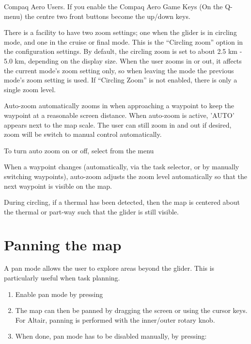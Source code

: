 Compaq Aero Users. If you enable the Compaq Aero Game Keys (On the
Q-menu) the centre two front buttons become the up/down keys.

There is a facility to have two zoom settings; one when the glider is
in circling mode, and one in the cruise or final mode.  This is the ``Circling
zoom'' option in the  configuration settings.  
By default, the circling zoom is set to about 2.5 km - 5.0 km, depending on the
display size. When the user zooms in or out, it affects the current
mode's zoom setting only, so when leaving the mode the previous mode's
zoom setting is used.  If ``Circling Zoom'' is not enabled,
there is only a single zoom level.

Auto-zoom automatically zooms in when approaching a waypoint to keep
the waypoint at a reasonable screen distance. When auto-zoom is active,
'AUTO' appears next to the map scale. The user can still zoom
in and out if desired, zoom will be switch to manual control automatically.

To turn auto zoom on or off, select from the menu
\begin{quote}
\blink{}\blink{} 
\end{quote}

When a waypoint changes (automatically, via the task selector, or by
manually switching waypoints), auto-zoom adjusts the zoom level
automatically so that the next waypoint is visible on the map.

During circling, if a thermal has been detected, then the map is centered about
the thermal or part-way such that the glider is still visible.

\section{Panning the map}

A pan mode allows the user to explore areas beyond the glider.  This
is particularly useful when task planning.
\begin{enumerate}
\item Enable pan mode by pressing 
\begin{quote}
\blink{}
\end{quote}

\item The map can then be panned by dragging the screen or using the cursor
  keys.  For Altair, panning is performed with the inner/outer rotary knob.
\item When done, pan mode has to be disabled manually, by pressing:
\begin{quote}
\end{quote}

\end{enumerate} 

